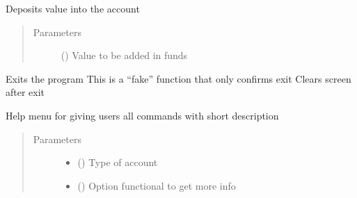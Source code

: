 \documentclass[letterpaper,10pt,english]{sphinxmanual}
\begin{document}

\begin{fulllineitems}
\label{\detokenize{bank:bank.terminalFunctions.deposit}}
Deposits value into the account
\begin{quote}\begin{description}
\item[{Parameters}] \leavevmode
{} () \textendash{} Value to be added in funds

\end{description}\end{quote}

\end{fulllineitems}


\begin{fulllineitems}
\label{\detokenize{bank:bank.terminalFunctions.exit}}
Exits the program
This is a “fake” function that only confirms exit
Clears screen after exit

\end{fulllineitems}


\begin{fulllineitems}
\label{\detokenize{bank:bank.terminalFunctions.help}}
Help menu for giving users all commands with short description
\begin{quote}\begin{description}
\item[{Parameters}] \leavevmode\begin{itemize}
\item {} 
 () \textendash{} Type of account

\item {} 
 () \textendash{} Option functional to get more info

\end{itemize}

\end{description}\end{quote}

\end{fulllineitems}
\end{document}

